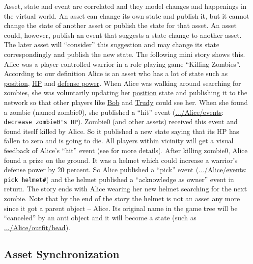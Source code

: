 \documentclass{sigchi}
\begin{document}
Asset, state and event are correlated and they model changes and happenings in the virtual world. An asset can change its own state and publish it, but it cannot change the state of another asset or publish the state for that asset. An asset could, however, publish an event that suggests a state change to another asset. The later asset will ``consider'' this suggestion and may change its state correspondingly and publish the new state. The following mini story shows this. Alice was a player-controlled warrior in a role-playing game ``Killing Zombies''. According to our definition Alice is an asset who has a lot of state such as \url{position}, \url{HP} and \url{defense power}. When Alice was walking around searching for zombies, she was voluntarily updating her \url{position} state and publishing it to the network so that other players like \url{Bob} and \url{Trudy} could see her. When she found a zombie (named zombie0), she published a ``hit'' event (\url{.../Alice/events}: \verb|decrease zombie0's HP|). Zombie0 (and other assets) received this event and found itself killed by Alice. So it published a new state saying that its HP has fallen to zero and is going to die. All players within vicinity will get a visual feedback of Alice's ``hit'' event (see  for more details). After killing zombie0, Alice found a prize on the ground. It was a helmet which could increase a warrior's defense power by 20 percent. So Alice published a ``pick'' event (\url{.../Alice/events}: \verb|pick helmet#|) and the helmet published a ``acknowledge as owner'' event in return. The story ends with Alice wearing her new helmet searching for the next zombie. Note that by the end of the story the helmet is not an asset any more since it got a parent object -- Alice. Its original name in the game tree will be ``canceled'' by an anti object and it will become a state (such as \url{.../Alice/outfit/head}).




\subsection{Asset Synchronization}
\label{assetsync}
\end{document}
